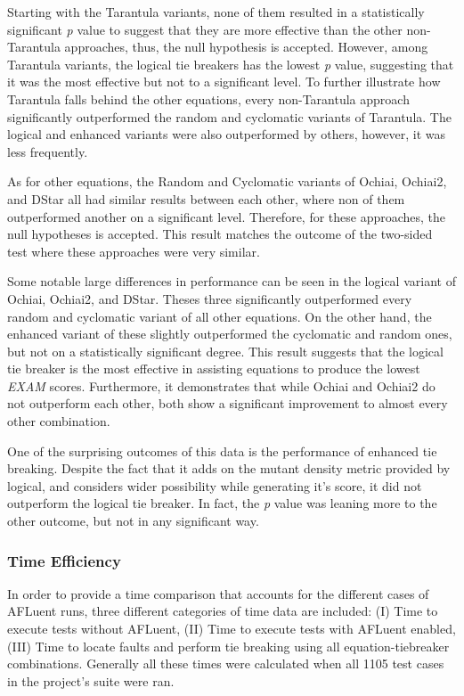 Starting with the Tarantula variants, none of them resulted in a statistically
significant \emph{p} value to suggest that they are more effective than the
other non-Tarantula approaches, thus, the null hypothesis is accepted. However,
among Tarantula variants, the logical tie breakers has the lowest \emph{p}
value, suggesting that it was the most effective but not to a significant level.
To further illustrate how Tarantula falls behind the other equations, every
non-Tarantula approach significantly outperformed the random and cyclomatic
variants of Tarantula. The logical and enhanced variants were also outperformed
by others, however, it was less frequently.

As for other equations, the Random and Cyclomatic variants of Ochiai, Ochiai2,
and DStar all had similar results between each other, where non of them
outperformed another on a significant level. Therefore, for these approaches,
the null hypotheses is accepted. This result matches the outcome of the
two-sided test where these approaches were very similar.

Some notable large differences in performance can be seen in the logical variant
of Ochiai, Ochiai2, and DStar. Theses three significantly outperformed every
random and cyclomatic variant of all other equations. On the other hand, the
enhanced variant of these slightly outperformed the cyclomatic and random ones,
but not on a statistically significant degree. This result suggests that the
logical tie breaker is the most effective in assisting equations to produce the
lowest \emph{EXAM} scores. Furthermore, it demonstrates that while Ochiai and
Ochiai2 do not outperform each other, both show a significant improvement to
almost every other combination.

One of the surprising outcomes of this data is the performance of enhanced tie
breaking. Despite the fact that it adds on the mutant density metric provided by
logical, and considers wider possibility while generating it's score, it did not
outperform the logical tie breaker. In fact, the \emph{p} value was leaning more
to the other outcome, but not in any significant way.

\subsubsection{Time Efficiency}
\label{subsubsec:time_Efficiency}

In order to provide a time comparison that accounts for the different cases of
AFLuent runs, three different categories of time data are included: (I) Time to
execute tests without AFLuent, (II) Time to execute tests with AFLuent enabled,
(III) Time to locate faults and perform tie breaking using all
equation-tiebreaker combinations. Generally all these times were calculated when
all 1105 test cases in the project's suite were ran.

